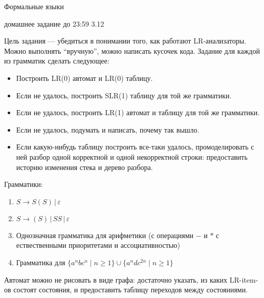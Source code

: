 \documentclass[12pt]{article}
\begin{document}
\begin{center} 
{\LARGE Формальные языки}

{\Large домашнее задание до 23:59 3.12}
\end{center}
\bigskip

Цель задания --- убедиться в понимании того, как работают LR-анализаторы. Можно выполнять ``вручную'', можно написать кусочек кода. Задание для каждой из грамматик сделать следующее: 
    
    \begin{itemize}
        \item Построить LR(0) автомат и LR(0) таблицу.
        \item Если не удалось, построить SLR(1) таблицу для той же грамматики.
        \item Если не удалось, построить LR(1) автомат и таблицу для той же грамматики.
        \item Если не удалось, подумать и написать, почему так вышло. 
        \item Если какую-нибудь таблицу построить все-таки удалось, промоделировать с ней разбор одной корректной и одной некорректной строки: предоставить историю изменения стека и дерево разбора.
    \end{itemize} 

Грамматики:

\begin{enumerate}
  \item $S \rightarrow  S ( S ) \, | \, \varepsilon$
  \item $ S \rightarrow  ( S ) \, | \, S S  \, | \, \varepsilon$
  \item Однозначная грамматика для арифметики (с операциями $-$ и $*$ с ествественными приоритетами и ассоциативностью)
  \item Грамматика для $\{ a^n b c^n \mid n \geq 1 \} \cup \{ a^n d c^{2n} \mid n \geq 1\}$ 
\end{enumerate}

  Автомат можно не рисовать в виде графа: достаточно указать, из каких LR-item-ов состоят состояния, и предоставить таблицу переходов между состояниями. 
\end{document}
